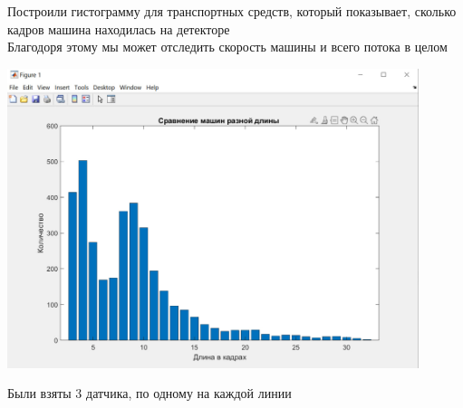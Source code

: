 \documentclass[a4paper,12pt]{article}
\begin{document}
Построили гистограмму для транспортных средств, который показывает, сколько кадров машина находилась на детекторе\\
Благодоря этому мы может отследить скорость машины и всего потока в целом
\begin{center}
\includegraphics[width=0.9\textwidth]{histogram.jpg}
\end{center}
\begin{center}
Были взяты 3 датчика, по одному на каждой линии
\end{center}

\newpage
\end{document}
